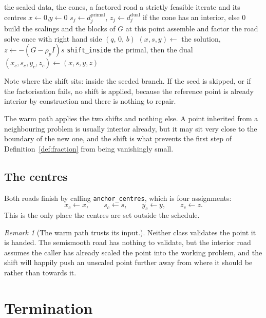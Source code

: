 \documentclass[a4paper,11pt]{book}
\theoremstyle{plain}
\theoremstyle{definition}
\theoremstyle{remark}
\newtheorem{remark}[theorem]{Remark}
\numberwithin{equation}{chapter}
\numberwithin{algorithm}{chapter}
\begin{document}
	\begin{algorithm}[H]
		\caption{The interior cold start}
		\begin{algorithmic}[1]
			\Require the scaled data, the cones, a factored road
			\Ensure a strictly feasible iterate and its centres
			\State $x\gets0$,\quad $y\gets0$
			\State $s_j\gets d_j^{\mathrm{primal}}$,\quad
			$z_j\gets d_j^{\mathrm{dual}}$ if the cone has an interior, else $0$
			\EndFor
			\State build the scalings and the blocks of $G$ at this point
			\State assemble and factor the road
			\State solve once with right hand side $(q,\,0,\,b)$
			\State $(x,s,y)\gets$ the solution,\quad $z\gets-(G-\rho_pI)s$
			\State \texttt{shift\_inside} the primal, then the dual
			\EndIf
			\EndIf
			\State $(x_c,s_c,y_c,z_c)\gets(x,s,y,z)$
		\end{algorithmic}
	\end{algorithm}

	Note where the shift sits: inside the seeded branch. If the seed is skipped,
	or if the factorisation fails, no shift is applied, because the reference
	point is already interior by construction and there is nothing to repair.

	The warm path applies the two shifts and nothing else. A point inherited from
	a neighbouring problem is usually interior already, but it may sit very close
	to the boundary of the new one, and the shift is what prevents the first
	step of Definition~\ref{def:fraction} from being vanishingly small.

	\section{The centres}

	Both roads finish by calling \texttt{anchor\_centres}, which is four
	assignments:
	\[
	x_c\gets x,
	\qquad
	s_c\gets s,
	\qquad
	y_c\gets y,
	\qquad
	z_c\gets z .
	\]
	This is the only place the centres are set outside the schedule.


	\begin{remark}[The warm path trusts its input.]
	Neither class validates the point it is handed. The semismooth road has
	nothing to validate, but the interior road assumes the caller has already
	scaled the point into the working problem, and the shift will happily push an
	unscaled point further away from where it should be rather than towards it.
\end{remark}
	\chapter{Termination}
\end{document}
